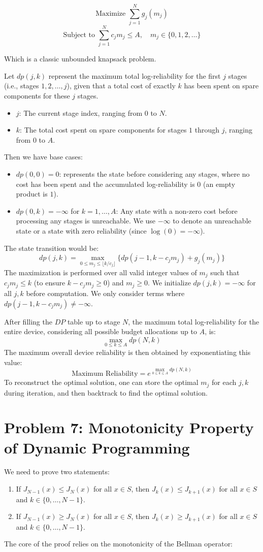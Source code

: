 \documentclass[11pt, a4paper, oneside]{memoir}
\begin{document}
\[ \text{Maximize } \sum_{j=1}^N g_j(m_j) \]
\[ \text{Subject to } \sum_{j=1}^N c_j m_j \leq A, \quad m_j \in \{0, 1, 2, \ldots\} \]

Which is a classic unbounded knapsack problem.

Let $dp(j, k)$ represent the maximum total log-reliability for the first $j$ stages (i.e., stages $1, 2, \ldots, j$), given that a total cost of exactly $k$ has been spent on spare components for these $j$ stages.
\begin{itemize}
\item $j$: The current stage index, ranging from $0$ to $N$.
\item $k$: The total cost spent on spare components for stages $1$ through $j$, ranging from $0$ to $A$.
\end{itemize}
Then we have base cases:
\begin{itemize}
  \item $dp(0, 0) = 0$: represents the state before considering any stages,
    where no cost has been spent and the accumulated log-reliability is $0$ (an empty product is $1$).
  \item $dp(0, k) = -\infty$ for $k = 1, \ldots, A$: Any state with a non-zero cost before processing any stages is unreachable.
    We use $-\infty$ to denote an unreachable state or a state with zero reliability (since $\log(0) = -\infty$).
\end{itemize}
The state transition would be:
\[ dp(j, k) = \max_{0 \leq m_j \leq \lfloor k / c_j \rfloor} \{ dp(j-1, k - c_j m_j) + g_j(m_j) \} \]
The maximization is performed over all valid integer values of $m_j$ such that $c_j m_j \leq k$
(to ensure $k - c_j m_j \geq 0$) and $m_j \geq 0$. We initialize $dp(j, k) = -\infty$ for all $j, k$ before computation.
We only consider terms where $dp(j-1, k - c_j m_j) \neq -\infty$.

After filling the $DP$ table up to stage $N$, the maximum total log-reliability for the entire device,
considering all possible budget allocations up to $A$, is:
\[ \max_{0 \leq k \leq A} dp(N, k) \]
The maximum overall device reliability is then obtained by exponentiating this value:
\[ \text{Maximum Reliability} = e^{\max_{0 \leq k \leq A} dp(N, k)} \]
To reconstruct the optimal solution, one can store the optimal $m_j$ for each $j, k$ during iteration,
and then backtrack to find the optimal solution.

\chapter{Problem 7: Monotonicity Property of Dynamic Programming}
We need to prove two statements:
\begin{enumerate}
\item If $J_{N-1}(x) \le J_N(x)$ for all $x \in S$, then $J_k(x) \le J_{k+1}(x)$ for all $x \in S$ and $k \in \{0, \dots, N-1\}$.
\item If $J_{N-1}(x) \ge J_N(x)$ for all $x \in S$, then $J_k(x) \ge J_{k+1}(x)$ for all $x \in S$ and $k \in \{0, \dots, N-1\}$.
\end{enumerate}
The core of the proof relies on the monotonicity of the Bellman operator:
\end{document}

